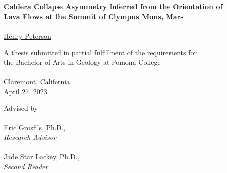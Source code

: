 \renewcommand{\headrulewidth}{0pt} %
\begin{titlepage}
    \begin{center}

        \phantom{.}
        \vfill
        \vfill
        \large\textbf{Caldera Collapse Asymmetry Inferred from the Orientation of\\
        Lava Flows at the Summit of Olympus Mons, Mars}
        \\~\\
        \href{mailto:hgpa2018@mymail.pomona.edu}{Henry Peterson}

        \vfill
        \vfill

        A thesis submitted in partial fulfillment of the requirements for\\
        the Bachelor of Arts in Geology at Pomona College\\~\\
        Claremont, California\\
        April 27, 2023

        \vfill
        \phantom{.}

        \newpage

        \phantom{.}
        \vfill
        Advised by
        \\~\\
        Eric Grosfils, Ph.D.,\\
        \emph{Research Advisor}
        \\~\\
        Jade Star Lackey, Ph.D.,\\
        \emph{Second Reader}
        \vfill
        \phantom{.}

    \end{center}
\end{titlepage}

\renewcommand{\headrulewidth}{0.5pt}